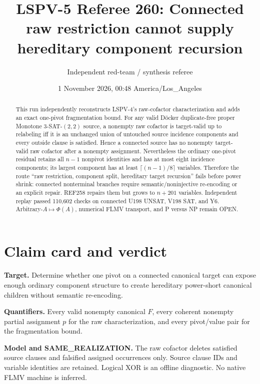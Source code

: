 \documentclass[11pt]{article}
\title{LSPV-5 Referee 260: Connected raw restriction cannot supply hereditary component recursion}
\author{Independent red-team / synthesis referee}
\date{1 November 2026, 00:48 America/Los\_Angeles}
\newcommand{\status}[1]{\textsf{#1}}
\begin{document}
\maketitle

\begin{abstract}
This run independently reconstructs LSPV-4's raw-cofactor characterization and adds an exact one-pivot fragmentation bound.  For any valid D\"ocker duplicate-free proper Monotone 3-SAT-$(2,2)$ source, a nonempty raw cofactor is target-valid up to relabeling iff it is an unchanged union of untouched source incidence components and every outside clause is satisfied.  Hence a connected source has no nonempty target-valid raw cofactor after a nonempty assignment.  Nevertheless the ordinary one-pivot residual retains all $n-1$ nonpivot identities and has at most eight incidence components; its largest component has at least $\lceil(n-1)/8\rceil$ variables.  Therefore the route ``raw restriction, component split, hereditary target recursion'' fails before power shrink: connected nonterminal branches require semantic/noninjective re-encoding or an explicit repair.  REF258 repairs them but grows to $n+201$ variables.  Independent replay passed 110,602 checks on connected U198 UNSAT, V198 SAT, and Y6.  Arbitrary-$A\mapsto\Phi(A)$, numerical FLMV transport, and P versus NP remain \status{OPEN}.
\end{abstract}

\section{Claim card and verdict}
\textbf{Target.}  Determine whether one pivot on a connected canonical target can expose enough ordinary component structure to create hereditary power-short canonical children without semantic re-encoding.

\textbf{Quantifiers.}  Every valid nonempty canonical $F$, every coherent nonempty partial assignment $p$ for the raw characterization, and every pivot/value pair for the fragmentation bound.

\textbf{Model and SAME\_REALIZATION.}  The raw cofactor deletes satisfied source clauses and falsified assigned occurrences only.  Source clause IDs and variable identities are retained.  Logical XOR is an offline diagnostic.  No native FLMV machine is inferred.
\end{document}
